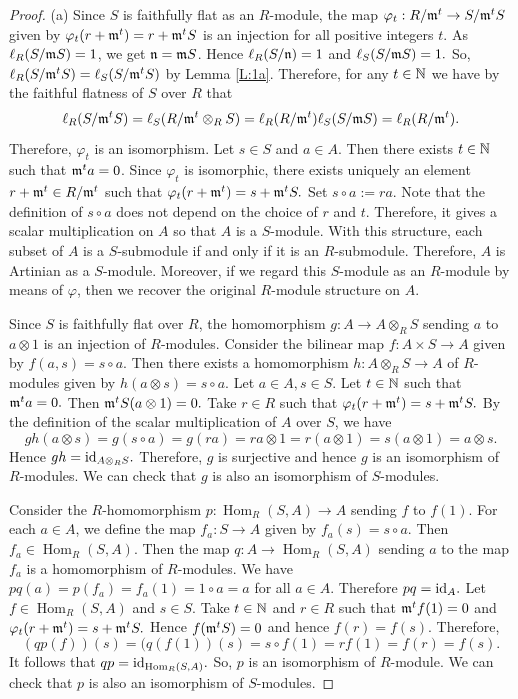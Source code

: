 \documentclass[a4papersize]{article}
\DeclareMathOperator{\Hom}{Hom}
\begin{document}
\begin{proof} (a) Since $S$ is faithfully flat as an $R$-module,  the map $\varphi_t: R/\frak m^t\rightarrow S/\frak m^tS$ given by $\varphi_t(r+\frak m^t)=r+\frak m^tS$  is an injection for all positive integers $t$. As $\ell_R(S/\frak mS)=1$, we get $\frak n=\frak mS$. Hence $\ell_R(S/\frak n)=1$ and $\ell_S(S/\frak mS)=1.$ So,  $\ell_R(S/\frak m^tS)=\ell_S(S/\frak m^tS)$ by Lemma \ref{L:1a}. Therefore, for any $t\in\Bbb N$ we have  by the faithful flatness of $S$ over $R$ that
$$\ell_R(S/\frak m^tS)=\ell_S(R/\frak m^t\otimes_RS)=\ell_R(R/\frak m^t)\ell_S(S/\frak mS)=\ell_R(R/\frak m^t).$$ Therefore, $\varphi_t$ is an isomorphism. Let $s\in S$ and $a\in A.$ Then there exists $t\in\Bbb N$ such that $\frak m^ta=0$.  Since $\varphi_t$ is isomorphic, there exists uniquely an element $r+\frak m^t\in R/\frak m^t$ such that $\varphi_t(r+\frak m^t)=s+\frak m^tS.$ Set $s\circ a:=ra$.  Note that the definition of $s\circ a$ does not depend on the choice of $r$ and $t$. Therefore, it gives a scalar multiplication on $A$ so that $A$ is a $S$-module. With this structure, each subset of $A$ is a $S$-submodule if and only if it is an $R$-submodule. Therefore, $A$ is Artinian as a $S$-module. Moreover, if we regard this $S$-module as an $R$-module by means of  $ \varphi$, then we recover the original $R$-module structure on $A$.

Since $S$ is faithfully flat over $R$, the homomorphism $g: A\rightarrow A\otimes_RS$ sending $a$ to $a\otimes 1$ is an injection of $R$-modules. Consider the bilinear map $f: A\times S\rightarrow A$ given by $f(a,s)=s\circ a.$ Then there exists a homomorphism $h: A \otimes_RS\rightarrow A$ of $R$-modules given by $h(a\otimes s)=s\circ a.$ Let $a\in A, s\in S$. Let $t\in\Bbb N$ such that $\frak m^ta=0.$ Then $\frak m^tS(a\otimes 1)=0.$ Take $r\in R$ such that $\varphi_t(r+\frak m^t)=s+\frak m^tS.$ By the definition of the scalar multiplication of $A$ over $S$, we have 
$$gh(a\otimes s)=g(s\circ a)=g(ra)=ra\otimes 1=r(a\otimes 1)=s(a\otimes 1)=a\otimes s.$$
Hence $gh={\rm id}_{A\otimes_RS}.$ Therefore, $g$ is surjective and hence $g$ is an isomorphism of $R$-modules. We can check that $g$ is also an isomorphism of $S$-modules.

 Consider the $R$-homomorphism $p:\Hom_R(S,A)\to A$ sending $f$ to $f(1)$. For each $a\in A$, we define the map $f_a: S\rightarrow A$ given by $f_a(s)=s\circ a.$ Then $f_a\in \Hom_R(S,A).$ Then the map $q: A\to\Hom_R(S,A)$ sending $a$ to the map $f_a$ is a homomorphism of $R$-modules. We have $pq(a)=p(f_a)=f_a(1)=1\circ a=a$ for all $a\in A.$ Therefore $pq={\rm id}_A.$ Let $f\in\Hom_R(S, A)$ and $s\in S.$ Take $t\in\Bbb N$ and $r\in R$ such that $\frak m^tf(1)=0$ and $\varphi_t(r+\frak m^t)=s+\frak m^tS.$ Hence $f(\frak m^tS)=0$ and hence $f(r)=f(s).$ Therefore,
 $$(qp(f))(s)=(q(f(1))(s)=s\circ f(1)=rf(1)=f(r)=f(s).$$ It follows that $qp={\rm id}_{\Hom_R(S,A)}.$ So, $p$ is an isomorphism of $R$-module.   We can check that $p$ is also an isomorphism of $S$-modules.



\end{proof}
\end{document}
